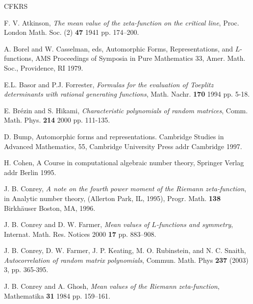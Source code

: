 \documentclass[12pt,letterpaper]{amsart}
\theoremstyle{plain}
\theoremstyle{definition}
\theoremstyle{remark}
\numberwithin{equation}{subsection}
\numberwithin{theorem}{subsection}
\numberwithin{table}{subsection}
\begin{document}
\begin{thebibliography}{CFKRS}

\newblock
 F. V. Atkinson,  {\it The mean value of the zeta-function on the critical line},   Proc. London Math. Soc.   (2)
 {\bf 47}   1941
 pp.  174--200.




\newblock   A. Borel and W. Casselman, eds,  Automorphic
Forms, Representations, and $L$-functions, AMS Proceedings of
Symposia in Pure Mathematics 33,   Amer. Math. Soc.,
Providence, RI   1979.



\newblock
 E.L. Basor and P.J. Forrester,  {\it Formulas for the evaluation of {T}oeplitz determinants
    with rational generating functions},   Math. Nachr.
 {\bf 170}   1994
 pp.  5-18.



\newblock
 E. Br\'ezin and S. Hikami,  {\it Characteristic polynomials of random matrices},   Comm. Math. Phys.
 {\bf 214}   2000
 pp.  111-135.




\newblock
 D. Bump,  Automorphic forms and representations. Cambridge Studies in Advanced Mathematics, 55,   Cambridge University Press
 addr  Cambridge
  1997.




\newblock
 H. Cohen,  A Course in computational algebraic number theory,   Springer Verlag
 addr  Berlin
  1995.



\newblock
 J. B.  Conrey,  {\it A note on the fourth power moment of the Riemann zeta-function}, 
in Analytic number theory, (Allerton Park, IL, 1995),  Progr. Math.
 {\bf 138}   Birkh\"{a}user Boston, MA, 1996.


\newblock   J. B. Conrey and D. W. Farmer,  {\it Mean values
of $L$-functions and symmetry},    Internat. Math. Res. Notices
  2000 {\bf 17}  pp. 883--908.



\newblock   J. B. Conrey, D. W. Farmer, J. P. Keating, M.
O. Rubinstein, and N. C. Snaith,  
{\it Autocorrelation of random matrix polynomials},   Commun. Math. Phys
{\bf 237} (2003) 3, pp. 365-395.




\newblock
 J. B. Conrey and A. Ghosh,  {\it Mean values of the Riemann zeta-function},   Mathematika
 {\bf 31}   1984
 pp.  159--161.






\end{thebibliography}
\end{document}
